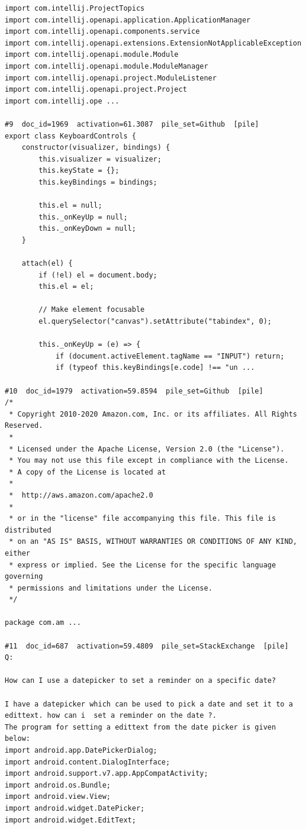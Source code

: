 \begin{verbatim}
import com.intellij.ProjectTopics
import com.intellij.openapi.application.ApplicationManager
import com.intellij.openapi.components.service
import com.intellij.openapi.extensions.ExtensionNotApplicableException
import com.intellij.openapi.module.Module
import com.intellij.openapi.module.ModuleManager
import com.intellij.openapi.project.ModuleListener
import com.intellij.openapi.project.Project
import com.intellij.ope ...

#9  doc_id=1969  activation=61.3087  pile_set=Github  [pile]
export class KeyboardControls {
    constructor(visualizer, bindings) {
        this.visualizer = visualizer;
        this.keyState = {};
        this.keyBindings = bindings;

        this.el = null;
        this._onKeyUp = null;
        this._onKeyDown = null;
    }

    attach(el) {
        if (!el) el = document.body;
        this.el = el;

        // Make element focusable
        el.querySelector("canvas").setAttribute("tabindex", 0);

        this._onKeyUp = (e) => {
            if (document.activeElement.tagName == "INPUT") return;
            if (typeof this.keyBindings[e.code] !== "un ...

#10  doc_id=1979  activation=59.8594  pile_set=Github  [pile]
/*
 * Copyright 2010-2020 Amazon.com, Inc. or its affiliates. All Rights Reserved.
 *
 * Licensed under the Apache License, Version 2.0 (the "License").
 * You may not use this file except in compliance with the License.
 * A copy of the License is located at
 *
 *  http://aws.amazon.com/apache2.0
 *
 * or in the "license" file accompanying this file. This file is distributed
 * on an "AS IS" BASIS, WITHOUT WARRANTIES OR CONDITIONS OF ANY KIND, either
 * express or implied. See the License for the specific language governing
 * permissions and limitations under the License.
 */

package com.am ...

#11  doc_id=687  activation=59.4809  pile_set=StackExchange  [pile]
Q:

How can I use a datepicker to set a reminder on a specific date?

I have a datepicker which can be used to pick a date and set it to a edittext. how can i  set a reminder on the date ?.
The program for setting a edittext from the date picker is given below:
import android.app.DatePickerDialog;
import android.content.DialogInterface; 
import android.support.v7.app.AppCompatActivity;
import android.os.Bundle;
import android.view.View;
import android.widget.DatePicker;
import android.widget.EditText;


\end{verbatim}
